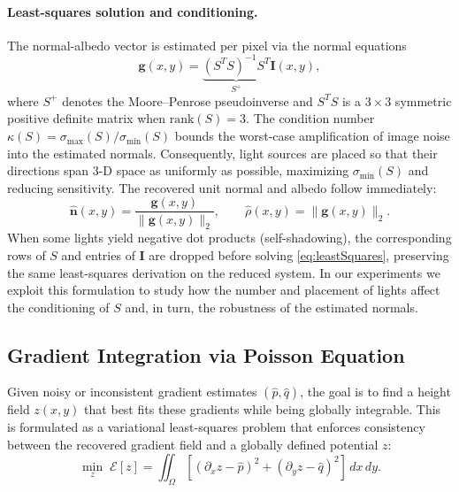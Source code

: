 \documentclass[11pt]{article}
\begin{document}
\paragraph{Least-squares solution and conditioning.} The normal-albedo vector is estimated per pixel via the normal equations
\begin{equation}
\mathbf{g}(x,y) = \underbrace{(S^TS)^{-1}S^T}_{S^+} \mathbf{I}(x,y),
\label{eq:leastSquares}
\end{equation}
where $S^+$ denotes the Moore--Penrose pseudoinverse and $S^TS$ is a $3\times 3$ symmetric positive definite matrix when $\text{rank}(S)=3$. The condition number $\kappa(S)=\sigma_\text{max}(S)/\sigma_\text{min}(S)$ bounds the worst-case amplification of image noise into the estimated normals. Consequently, light sources are placed so that their directions span 3-D space as uniformly as possible, maximizing $\sigma_\text{min}(S)$ and reducing sensitivity. The recovered unit normal and albedo follow immediately:
\begin{equation}
\hat{\mathbf{n}}(x,y) = \frac{\mathbf{g}(x,y)}{\|\mathbf{g}(x,y)\|_2}, \qquad \hat{\rho}(x,y) = \|\mathbf{g}(x,y)\|_2.
\end{equation}
When some lights yield negative dot products (self-shadowing), the corresponding rows of $S$ and entries of $\mathbf{I}$ are dropped before solving \eqref{eq:leastSquares}, preserving the same least-squares derivation on the reduced system. In our experiments we exploit this formulation to study how the number and placement of lights affect the conditioning of $S$ and, in turn, the robustness of the estimated normals.

\subsection{Gradient Integration via Poisson Equation}

Given noisy or inconsistent gradient estimates $(\hat{p}, \hat{q})$, the goal is to find a height field $z(x,y)$ that best fits these gradients while being globally integrable. 
This is formulated as a variational least-squares problem that enforces consistency between the recovered gradient field and a globally defined potential $z$:
\begin{equation}\label{eq:poisson_variational}
\min_{z} \; \mathcal{E}[z] = \iint_\Omega \left[(\partial_x z - \hat{p})^2 + (\partial_y z - \hat{q})^2\right] \, dx \, dy.
\end{equation}
\end{document}
